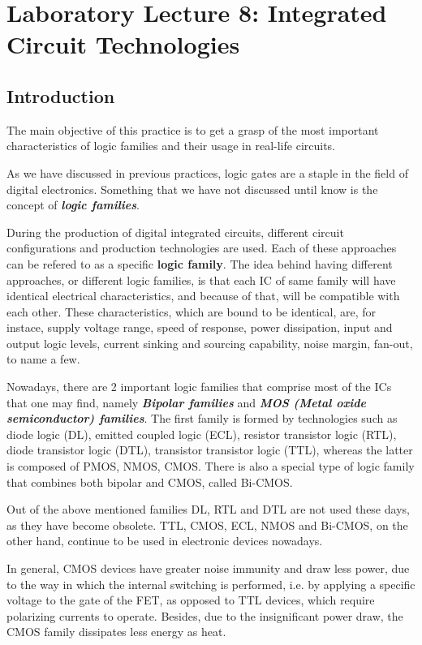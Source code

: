 \section{Laboratory Lecture 8: Integrated Circuit Technologies}

\subsection{Introduction}

The main objective of this practice is to get a grasp of the most important characteristics of logic families and their usage in real-life circuits.\medskip

As we have discussed in previous practices, logic gates are a staple in the field of digital electronics. Something that we have not discussed until know is the concept of \textbf{\textit{logic families}}. \medskip

During the production of digital integrated circuits, different circuit configurations and production technologies are used. Each of these approaches can be refered to as a specific \textbf{logic family}. The idea behind having different approaches, or different logic families, is that each IC of same family will have identical electrical characteristics, and because of that, will be compatible with each other. These characteristics, which are bound to be identical, are, for instace, supply voltage range, speed of response, power dissipation, input and output logic levels, current sinking and sourcing capability, noise margin, fan-out, to name a few.\medskip

Nowadays, there are 2 important logic families that comprise most of the ICs that one may find, namely \textbf{\textit{Bipolar families}} and \textbf{\textit{MOS (Metal oxide semiconductor) families}}. The first family is formed by technologies such as diode logic (DL), emitted coupled logic (ECL), resistor transistor logic (RTL), diode transistor logic (DTL), transistor transistor logic (TTL), whereas the latter is composed of PMOS, NMOS, CMOS. There is also a special type of logic family that combines both bipolar and CMOS, called Bi-CMOS. \medskip

Out of the above mentioned families DL, RTL and DTL are not used these days, as they have become obsolete. TTL, CMOS, ECL, NMOS and Bi-CMOS, on the other hand, continue to be used in electronic devices nowadays.\medskip

In general, CMOS devices have greater noise immunity and draw less power, due to the way in which the internal switching is performed, i.e. by applying a specific voltage to the gate of the FET, as opposed to TTL devices, which require polarizing currents to operate. Besides, due to the insignificant power draw, the CMOS family dissipates less energy as heat. \medskip

